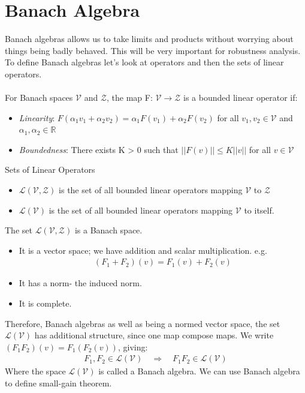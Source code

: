 \documentclass{article}[12pt]
\newcommand{\norm}[1]{\left|\left|#1\right|\right|}
\begin{document}
\section{Banach Algebra}
Banach algebras allows us to take limits and products without worrying about things being badly behaved. This will be very important for robustness analysis. To define Banach algebras let's look at operators and then the sets of linear operators.\\ \\
For Banach spaces $\mathcal{V}$ and $\mathcal{Z}$, the map F: $\mathcal{V}\xrightarrow{}\mathcal{Z}$ is a bounded linear operator if:
\begin{itemize}
    \item \textit{Linearity}: $F(\alpha_1 v_1 + \alpha_2 v_2) = \alpha_1F(v_1) + \alpha_2 F(v_2)$ for all $v_1,v_2 \in \mathcal{V}$ and $\alpha_1, \alpha_2 \in \mathbb{R}$
    \item \textit{Boundedness}: There exists K > 0 such that $\norm{F(v)} \leq K\norm{v}$ for all $v \in \mathcal{V}$
\end{itemize}
Sets of Linear Operators
\begin{itemize}
    \item     $\mathcal{L}(\mathcal{V,Z})$ is the set of all bounded linear operators mapping $\mathcal{V}$ to $\mathcal{Z}$
    \item   $\mathcal{L(V)}$ is the set of all bounded linear operators mapping $\mathcal{V}$ to itself.
\end{itemize}
The set $\mathcal{L}(\mathcal{V,Z})$ is a Banach space.
\begin{itemize}
    \item It is a vector space; we have addition and scalar multiplication. e.g.
    \begin{align*}
        (F_1 + F_2)(v) = F_1(v) + F_2(v)
    \end{align*}
    \item It has a norm- the induced norm.
    \item It is complete.
\end{itemize}
Therefore, Banach algebras as well as being a normed vector space, the set $\mathcal{L(V)}$ has additional structure, since one map compose maps. We write $(F_1 F_2)(v) = F_1(F_2(v))$, giving:
\begin{align*}
    F_1, F_2 \in \mathcal{L(V)} \quad \Longrightarrow \quad F_1 F_2 \in \mathcal{L(V)}
\end{align*}
Where the space $\mathcal{L(V)}$ is called a Banach algebra. We can use Banach algebra to define small-gain theorem.
\end{document}
